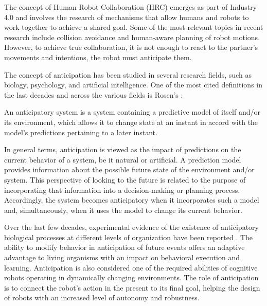 \documentclass[conference]{IEEEtran}
\begin{document}
The concept of Human-Robot Collaboration (HRC) emerges as part of Industry 4.0 and involves the research of mechanisms that allow humans and robots to work together to achieve a shared goal. Some of the most relevant topics in recent research include collision avoidance and human-aware planning of robot motions. However, to achieve true collaboration, it is not enough to react to the partner’s movements and intentions, the robot must anticipate them.



The concept of anticipation has been studied in several research fields, such as biology, psychology, and artificial intelligence. One of the most cited definitions in the last decades and across the various fields is Rosen’s \cite{Rosen1985}:

\begin{displayquote}
An anticipatory system is a system containing a predictive model of itself and/or its environment, which allows it to change state at an instant in accord with the model’s predictions pertaining to a later instant.
\end{displayquote}

In general terms, anticipation is viewed as the impact of predictions on the current behavior of a system, be it natural or artificial. A prediction model provides information about the possible future state of the environment and/or system. This perspective of looking to the future is related to the purpose of incorporating that information into a decision-making or planning process. Accordingly, the system becomes anticipatory when it incorporates such a model and, simultaneously, when it uses the model to change its current behavior.

Over the last few decades, experimental evidence of the existence of anticipatory biological processes at different levels of organization have been reported \cite{Deans2021,Poli2010,Louie2010}. The ability to modify behavior in anticipation of future events offers an adaptive advantage to living organisms with an impact on behavioral execution and learning. Anticipation is also considered one of the required abilities of cognitive robots operating in dynamically changing environments. The role of anticipation is to connect the robot’s action in the present to its final goal, helping the design of robots with an increased level of autonomy and robustness.
\end{document}
